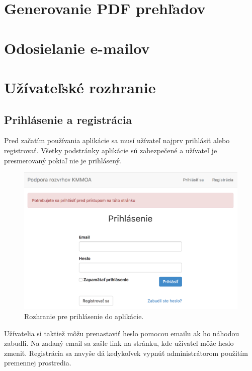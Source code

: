 \section{Generovanie PDF prehľadov}
\section{Odosielanie e-mailov}

\clearpage
\section{Užívateľské rozhranie}

\subsection{Prihlásenie a registrácia}

Pred začatím používania aplikácie sa musí užívateľ najprv prihlásiť alebo registrovať. Všetky podstránky aplikácie sú zabezpečené a užívateľ je presmerovaný pokiaľ nie je prihlásený.

\begin{figure}[!htb]
  \centering
  \includegraphics[width=1\textwidth]{content/images/login}
  \caption{Rozhranie pre prihlásenie do aplikácie.}
\end{figure}

Užívatelia si taktiež môžu prenastaviť heslo pomocou emailu ak ho náhodou zabudli. Na zadaný email sa zašle link na stránku, kde užívateľ môže heslo zmeniť. Registrácia sa navyše dá kedykoľvek vypnúť administrátorom použitím premennej prostredia.

